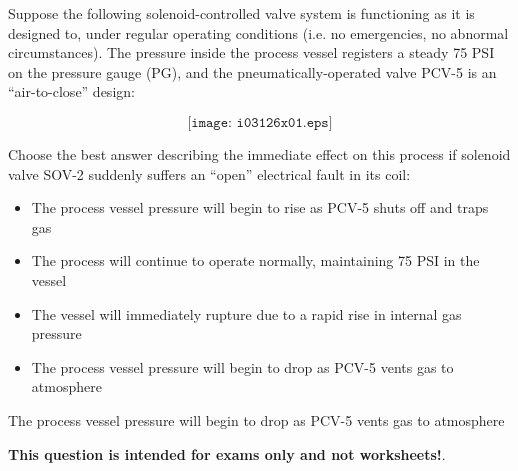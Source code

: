 

Suppose the following solenoid-controlled valve system is functioning as it is designed to, under regular operating conditions (i.e. no emergencies, no abnormal circumstances).  The pressure inside the process vessel registers a steady 75 PSI on the pressure gauge (PG), and the pneumatically-operated valve PCV-5 is an ``air-to-close'' design:

$$\texttt{[image: i03126x01.eps]}$$

\noindent
Choose the best answer describing the immediate effect on this process if solenoid valve SOV-2 suddenly suffers an ``open'' electrical fault in its coil:

\begin{itemize}
\item{} The process vessel pressure will begin to rise as PCV-5 shuts off and traps gas
\vskip 10pt
\item{} The process will continue to operate normally, maintaining 75 PSI in the vessel
\vskip 10pt
\item{} The vessel will immediately rupture due to a rapid rise in internal gas pressure
\vskip 10pt
\item{} The process vessel pressure will begin to drop as PCV-5 vents gas to atmosphere
\end{itemize}







The process vessel pressure will begin to drop as PCV-5 vents gas to atmosphere







{\bf This question is intended for exams only and not worksheets!}.



